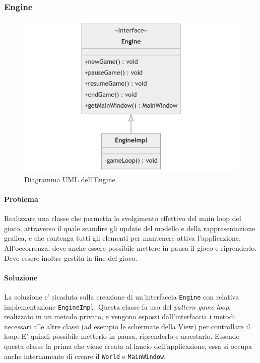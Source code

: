 \documentclass[a4paper,12pt]{report}
\begin{document}
\subsubsection{Engine}

\begin{figure}[h]
	\centering
	\includegraphics[width=\textwidth]{uml/uml_engine.png}
	\caption{Diagramma UML dell'Engine}
	\label{img:badarch}
\end{figure}

\paragraph*{Problema}
Realizzare una classe che permetta lo svolgimento effettivo del main loop del gioco, attraverso il quale scandire gli update del modello e della rappresentazione grafica, e che contenga tutti gli elementi per mantenere attiva l'applicazione. All'occorrenza, deve anche essere possibile mettere in pausa il gioco e riprenderlo. Deve essere inoltre gestita la fine del gioco.

\paragraph*{Soluzione} La soluzione e' ricaduta sulla creazione di un'interfaccia \texttt{Engine} con relativa implementazione \texttt{EngineImpl}. Questa classe fa uso del \textit{pattern game loop}, realizzato in un metodo privato, e vengono esposti dall'interfaccia i metodi necessari alle altre classi (ad esempio le schermate della View) per controllare il loop. E' quindi possibile metterlo in pausa, riprenderlo e arrestarlo. Essendo questa classe la prima che viene creata al lancio dell'applicazione, essa si occupa anche internamente di creare il \texttt{World} e \texttt{MainWindow}.
\end{document}
